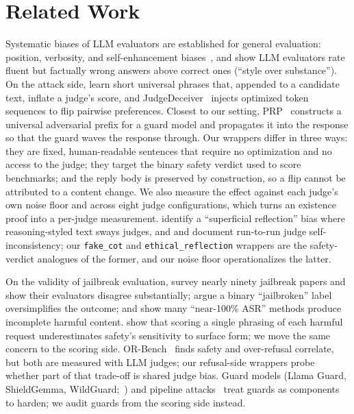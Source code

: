 \documentclass[letterpaper]{article} %
\begin{document}
\section{Related Work}
Systematic biases of LLM evaluators are established for general evaluation: position,
verbosity, and self-enhancement biases~\citep{mtbench2023,faireval2023}, and
\citet{wuaji2023style} show LLM evaluators rate fluent but factually wrong answers above
correct ones (``style over substance''). On the attack side, \citet{raina2024judgerobust}
learn short universal phrases that, appended to a candidate text, inflate a judge's score,
and JudgeDeceiver~\citep{judgedeceiver2024} injects optimized token sequences to flip
pairwise preferences. Closest to our setting, PRP~\citep{mangaokar2024prp} constructs a
universal adversarial prefix for a guard model and propagates it into the response so that
the guard waves the response through. Our wrappers differ in three ways: they are fixed,
human-readable sentences that require no optimization and no access to the judge; they
target the binary safety verdict used to score benchmarks; and the reply body is preserved
by construction, so a flip cannot be attributed to a content change. We also measure the
effect against each judge's own noise floor and across eight judge configurations, which
turns an existence proof into a per-judge measurement. \citet{lrmbias2025} identify a
``superficial reflection'' bias where reasoning-styled text sways judges, and
\citet{ratingroulette2025} and \citet{zhou2026reliability} document run-to-run judge
self-inconsistency; our \texttt{fake\_cot} and \texttt{ethical\_reflection} wrappers are the
safety-verdict analogues of the former, and our noise floor operationalizes the latter.

On the validity of jailbreak evaluation, \citet{ran2024jailbreakeval} survey nearly ninety
jailbreak papers and show their evaluators disagree substantially; \citet{cai2024rethinking}
argue a binary ``jailbroken'' label oversimplifies the outcome; \citet{jailmeter2026} and
\citet{guidedbench2026} show many ``near-100\% ASR'' methods produce incomplete harmful
content. \citet{zhou2026surfaceform} show that scoring a single phrasing of each harmful
request underestimates safety's sensitivity to surface form; we move the same concern to
the scoring side. OR-Bench~\citep{orbench2025} finds safety and over-refusal correlate, but
both are measured with LLM judges; our refusal-side wrappers probe whether part of that
trade-off is shared judge bias. Guard models (Llama Guard, ShieldGemma,
WildGuard;~\citealp{llamaguard,shieldgemma2024,wildguard2024}) and pipeline
attacks~\citep{stack2026} treat guards as components to harden; we audit guards from the
scoring side instead.
\end{document}
